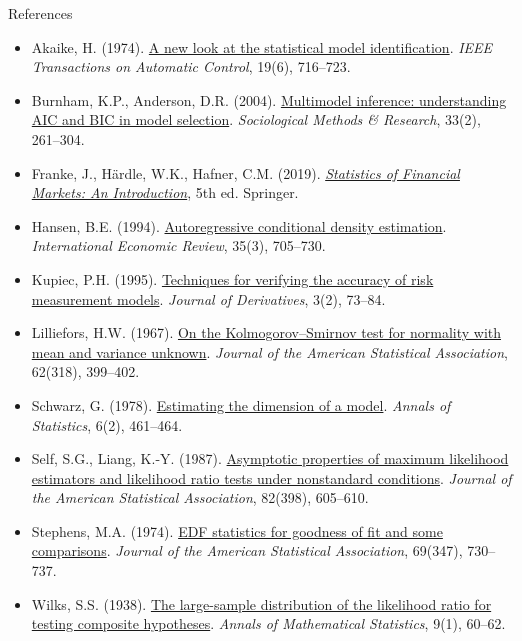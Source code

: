 \begin{frame}{References}
\itemsize{\tiny}
\begin{itemize}
    \item Akaike, H. (1974). \href{https://doi.org/10.1109/TAC.1974.1100705}{A new look at the statistical model identification}. \textit{IEEE Transactions on Automatic Control}, 19(6), 716--723.
    \item Burnham, K.P., Anderson, D.R. (2004). \href{https://doi.org/10.1177/0049124104268644}{Multimodel inference: understanding AIC and BIC in model selection}. \textit{Sociological Methods \& Research}, 33(2), 261--304.
    \item Franke, J., Härdle, W.K., Hafner, C.M. (2019). \href{https://doi.org/10.1007/978-3-030-13751-9}{\textit{Statistics of Financial Markets: An Introduction}}, 5th ed. Springer.
    \item Hansen, B.E. (1994). \href{https://doi.org/10.2307/2527081}{Autoregressive conditional density estimation}. \textit{International Economic Review}, 35(3), 705--730.
    \item Kupiec, P.H. (1995). \href{https://doi.org/10.3905/jod.1995.407942}{Techniques for verifying the accuracy of risk measurement models}. \textit{Journal of Derivatives}, 3(2), 73--84.
    \item Lilliefors, H.W. (1967). \href{https://doi.org/10.1080/01621459.1967.10482916}{On the Kolmogorov--Smirnov test for normality with mean and variance unknown}. \textit{Journal of the American Statistical Association}, 62(318), 399--402.
    \item Schwarz, G. (1978). \href{https://doi.org/10.1214/aos/1176344136}{Estimating the dimension of a model}. \textit{Annals of Statistics}, 6(2), 461--464.
    \item Self, S.G., Liang, K.-Y. (1987). \href{https://doi.org/10.1080/01621459.1987.10478472}{Asymptotic properties of maximum likelihood estimators and likelihood ratio tests under nonstandard conditions}. \textit{Journal of the American Statistical Association}, 82(398), 605--610.
    \item Stephens, M.A. (1974). \href{https://doi.org/10.1080/01621459.1974.10480196}{EDF statistics for goodness of fit and some comparisons}. \textit{Journal of the American Statistical Association}, 69(347), 730--737.
    \item Wilks, S.S. (1938). \href{https://doi.org/10.1214/aoms/1177732360}{The large-sample distribution of the likelihood ratio for testing composite hypotheses}. \textit{Annals of Mathematical Statistics}, 9(1), 60--62.
\end{itemize}
\end{frame}


